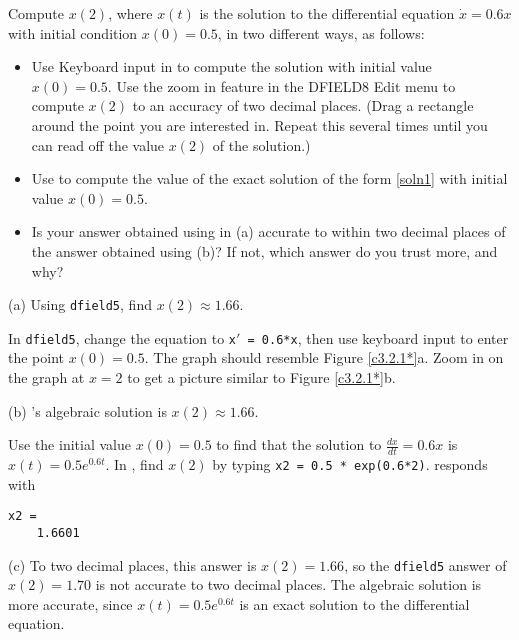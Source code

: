 \documentclass{ximera}
\begin{document}
\begin{exercise} \label{c3.2.1*}
Compute $x(2)$, where $x(t)$ is the solution to the differential equation 
$\dot{x} = 0.6x$ with initial condition $x(0)=0.5$, in two different ways, 
as follows:
\begin{itemize}
\item[(a)] Use {\sf Keyboard input} in {\dfield} to compute the 
solution with initial value $x(0)=0.5$.  Use the {\sf zoom in} feature in 
the {\sf DFIELD8 Edit} menu to compute $x(2)$ to an accuracy of two decimal 
places.  (Drag a rectangle around the point you are interested in.  Repeat 
this several times until you can read off the value $x(2)$ of the solution.)  
\item[(b)] Use \Matlab to compute the value of the exact solution
of the form \eqref{soln1} with initial value $x(0)=0.5$.  
\item[(c)] Is your answer obtained using {\dfield} in (a) accurate to 
within two decimal places of the answer obtained using (b)?  If not, 
which answer do you trust more, and why?
\end{itemize}

\begin{solution}

(a) \ans Using {\tt dfield5}, find $x(2) \approx 1.66$.

\soln In {\tt dfield5}, change the equation to {\tt x$'$ = 0.6*x}, then
use keyboard input to enter the point $x(0) = 0.5$.  The graph should
resemble Figure \ref{c3.2.1*}a.  Zoom in on the graph at $x = 2$ to get a
picture similar to Figure \ref{c3.2.1*}b.

(b) \ans \Matlabp's algebraic solution is $x(2) \approx 1.66$.

\soln Use the initial value $x(0) = 0.5$ to find that the solution to
$\frac{dx}{dt} = 0.6x$ is $x(t) = 0.5e^{0.6t}$.  In \Matlabp, find $x(2)$
by typing {\tt x2 = 0.5 * exp(0.6*2)}.
\Matlab responds with
\begin{verbatim}
x2 =
    1.6601
\end{verbatim}

(c) To two decimal places, this answer is $x(2) = 1.66$, so the
{\tt dfield5} answer of $x(2) = 1.70$ is not accurate to two decimal
places.  The algebraic solution is more accurate, since $x(t) = 0.5e^{0.6t}$
is an exact solution to the differential equation.

\begin{figure}[htb]
                       \centerline{%
                       }
\end{figure}

\end{solution}
\end{exercise}
\end{document}
